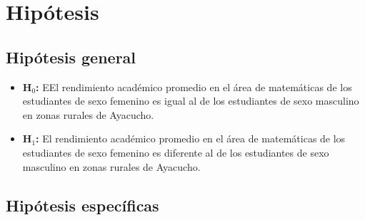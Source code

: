 \documentclass[
]{article}
\begin{document}
\section*{Hipótesis}\label{hipuxf3tesis}

\subsection*{Hipótesis general}\label{hipuxf3tesis-general}

\begin{itemize}
    \item \textbf{H$_{0}$:} EEl rendimiento académico promedio en el área de matemáticas de los estudiantes de sexo femenino es igual al de los estudiantes de sexo masculino en zonas rurales de Ayacucho.

  \item \textbf{H$_{1}$:} El rendimiento académico promedio en el área de matemáticas de los estudiantes de sexo femenino es diferente al de los estudiantes de sexo masculino en zonas rurales de Ayacucho.

\end{itemize}

\subsection*{Hipótesis específicas}\label{hipuxf3tesis-especuxedficas}
\end{document}
